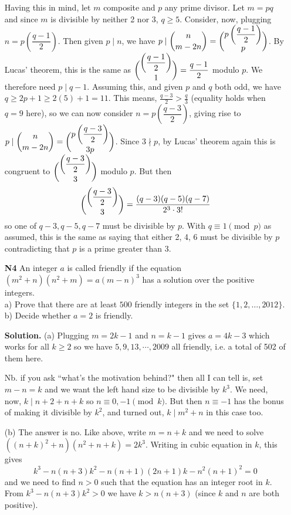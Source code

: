 \documentclass[11pt,a4paper]{article}
\begin{document}
\begin{enumerate}
	Having this in mind, let $m$ composite and $p$ any prime divisor. Let $m=pq$ and since $m$ is divisible by neither 2 nor 3, $q\ge 5$. Consider, now, plugging $n=p\left(\dfrac{q-1}{2}\right)$. Then given $p\mid n$, we have $p\mid \dbinom{n}{m-2n}=\dbinom{p\left(\dfrac{q-1}{2}\right)}{p}$. By Lucas' theorem, this is the same as $\dbinom{\left(\dfrac{q-1}{2}\right)}{1}=\dfrac{q-1}{2}$ modulo $p$. We therefore need $p\mid q-1$. 
	Assuming this, and given $p$ and $q$ both odd, we have $q\ge 2p+1\ge2(5)+1=11$. This means, $\frac{q-3}{2} > \frac{q}{3}$ (equality holds when $q=9$ here), so we can now consider $n=p\left(\dfrac{q-3}{2}\right)$, giving rise to $p\mid \dbinom{n}{m-2n}=\dbinom{p\left(\dfrac{q-3}{2}\right)}{3p}$. 
	Since $3\nmid p$, by Lucas' theorem again this is congruent to $\dbinom{\left(\dfrac{q-3}{2}\right)}{3}$ modulo $p$. But then 
	\[
	\dbinom{\left(\dfrac{q-3}{2}\right)}{3}
	=\frac{(q-3)(q-5)(q-7)}{2^3\cdot 3!}
	\]
	so one of $q-3, q-5, q-7$ must be divisible by $p$. 
	With $q\equiv 1\pmod{p}$ as assumed, this is the same as saying that either 2, 4, 6 must be divisible by $p$ contradicting that $p$ is a prime greater than 3. 
	
	\item[\textbf{N4}] An integer $a$ is called friendly if the equation $(m^2+n)(n^2+m)=a(m-n)^3$ has a solution over the positive integers.\\
	a) Prove that there are at least $500$ friendly integers in the set $\{ 1,2,\ldots ,2012\}$.\\
	b) Decide whether $a=2$ is friendly.
	
	\textbf{Solution.} (a) Plugging $m=2k-1$ and $n=k-1$ gives $a = 4k-3$ which works for all $k\ge 2$ so we have $5, 9, 13, \cdots , 2009$ all friendly, i.e. a total of 502 of them here. 
	
	Nb. if you ask ``what's the motivation behind?" then all I can tell is, set $m-n=k$ and we want the left hand size to be divisible by $k^3$. We need, now, $k\mid n+2+n+k$ so $n\equiv 0, -1\pmod{k}$. But then $n\equiv -1$ has the bonus of making it divisible by $k^2$, and turned out, $k\mid m^2+n$ in this case too. 
	
	(b) The answer is no. Like above, write $m=n+k$ and we need to solve $((n+k)^2+n)(n^2+n+k)=2k^3$. 
	Writing in cubic equation in $k$, this gives 
	\[k^3-n(n+3)k^2-n(n+1)(2n+1)k-n^2(n+1)^2=0\]
	and we need to find $n>0$ such that the equation has an integer root in $k$. 
	From $k^3-n(n+3)k^2>0$ we have $k>n(n+3)$ (since $k$ and $n$ are both positive). 
	

\end{enumerate}
\end{document}
